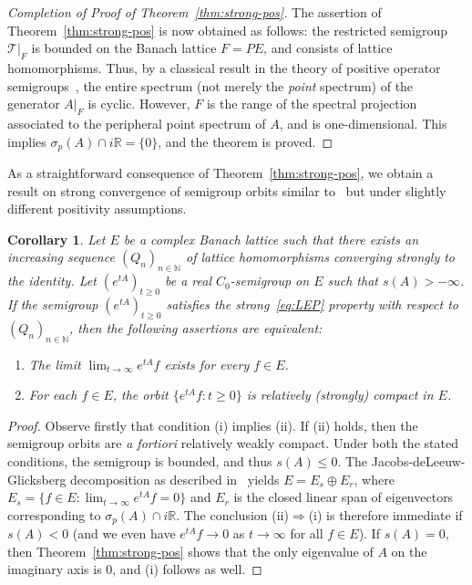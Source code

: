 \documentclass[sn-mathphys]{sn-jnl}%
\theoremstyle{thmstyleone}
\newtheorem{corollary}[theorem]{Corollary}
\theoremstyle{thmstylethree}
\newcommand{\NN}{\mathbb{N}}
\newcommand{\RR}{\mathbb{R}}
\begin{document}
\begin{proof}[Completion of Proof of Theorem~\ref{thm:strong-pos}]
	The assertion of Theorem~\ref{thm:strong-pos} is now obtained as follows: the restricted semigroup $\mathcal{T}\vert_F$ is bounded on the Banach lattice $F=PE$, and consists of lattice homomorphisms. Thus, by a classical result in the theory of positive operator semigroups~\cite[C-III, Theorem 2.10]{AGG}, the entire spectrum (not merely the \emph{point} spectrum) of the generator $A\vert_F$ is cyclic. However, $F$ is the range of the spectral projection associated to the peripheral point spectrum of $A$, and is one-dimensional. This implies $\sigma_p(A)\cap i\RR=\{0\}$, and the theorem is proved.
\end{proof}

As a straightforward consequence of Theorem~\ref{thm:strong-pos}, we obtain a result on strong convergence of semigroup orbits similar to~\cite[Corollary 2.2]{ArG21} but under slightly different positivity assumptions.
\begin{corollary}
	Let $E$ be a complex Banach lattice such that there exists an increasing sequence $(Q_n)_{n\in\NN}$ of lattice homomorphisms converging strongly to the identity. Let $(e^{tA})_{t\ge 0}$ be a real $C_0$-semigroup on $E$ such that $s(A)>-\infty$. If the semigroup $(e^{tA})_{t\ge 0}$ satisfies the strong~\eqref{eq:LEP} property with respect to $(Q_n)_{n\in\NN}$, then the following assertions are equivalent:
	\begin{enumerate}[\upshape(i)]
		\item The limit $\lim_{t\to\infty} e^{tA}f$ exists for every $f\in E$.
		\item For each $f\in E$, the orbit $\{e^{tA}f : t \ge 0\}$ is relatively (strongly) compact in $E$.
	\end{enumerate}
\end{corollary}
\begin{proof}
	Observe firstly that condition (i) implies (ii). If (ii) holds, then the semigroup orbits are \emph{a fortiori} relatively weakly compact. Under both the stated conditions, the semigroup is bounded, and thus $s(A)\le0$. The Jacobs-deLeeuw-Glicksberg decomposition as described in~\cite[Theorem V.2.14]{EN00} yields $E=E_s \oplus E_r$, where $E_s = \{f\in E: \lim_{t\to\infty}e^{tA}f = 0\}$ and $E_r$ is the closed linear span of eigenvectors corresponding to $\sigma_p(A)\cap i\RR$. The conclusion (ii)$\Rightarrow$(i) is therefore immediate if $s(A)<0$ (and we even have $e^{tA}f \to 0$ as $t\to\infty$ for all $f\in E$). If $s(A)=0$, then Theorem~\ref{thm:strong-pos} shows that the only eigenvalue of $A$ on the imaginary axis is 0, and (i) follows as well.
\end{proof}
\end{document}
